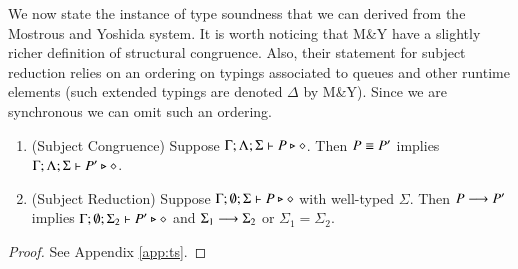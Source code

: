 We now state the instance of type soundness that we can derived from the Mostrous and Yoshida system.
It is worth noticing that M\&Y have a slightly richer definition of structural congruence.
Also, their statement for subject reduction relies on an ordering on typings associated to queues and other 
runtime elements (such extended typings are denoted $\Delta$ by M\&Y).
Since we are synchronous we can omit such an ordering.

\begin{theorem}\label{t:sr}\rm
	\begin{enumerate}[1.]
		\item	(Subject Congruence) Suppose $\Gamma; \Lambda; \Sigma \vdash P \triangleright \diamond$.
			Then $P \equiv P'$ implies $\Gamma; \Lambda; \Sigma \vdash P' \triangleright \diamond$.

		\item	(Subject Reduction) Suppose $\Gamma; \emptyset; \Sigma \vdash P \triangleright \diamond$
			with
			well-typed $\Sigma$.
			Then $P \longrightarrow P'$ implies $\Gamma; \emptyset; \Sigma_2  \vdash P' \triangleright \diamond$
			and $\Sigma_1 \longrightarrow \Sigma_2$ or $\Sigma_1 = \Sigma_2$.
	\end{enumerate}
\end{theorem}

\begin{proof}
See Appendix \ref{app:ts}.
\end{proof}
